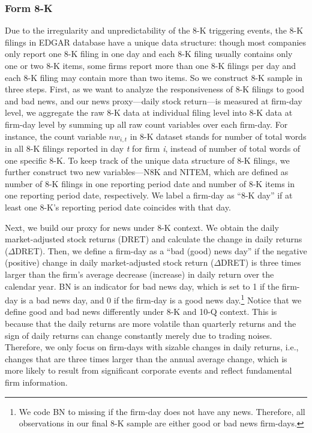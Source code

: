 \documentclass[a4paper]{article}
\begin{document}
\begin{spacing}{2}
\subsubsection{Form 8-K}
Due to the irregularity and unpredictability of the 8-K triggering events, the 8-K filings in EDGAR database have a unique data structure: though most companies only report one 8-K filing in one day and each 8-K filing usually contains only one or two 8-K items, some firms report more than one 8-K filings per day and each 8-K filing may contain more than two items. So we construct 8-K sample in three steps. First, as we want to analyze the responsiveness of 8-K filings to good and bad news, and our news proxy---daily stock return---is measured at firm-day level, we aggregate the raw 8-K data at individual filing level into 8-K data at firm-day level by summing up all raw count variables over each firm-day. For instance, the count variable $nw_{i,t}$ in 8-K dataset stands for number of total words in all 8-K filings reported in day \textit{t} for firm \textit{i}, instead of number of total words of one specific 8-K. To keep track of the unique data structure of 8-K filings, we further construct two new variables---N8K and NITEM, which are defined as number of 8-K filings in one reporting period date and number of 8-K items in one reporting period date, respectively. We label a firm-day as ``8-K day” if at least one 8-K's reporting period date coincides with that day.

Next, we build our proxy for news under 8-K context. We obtain the daily market-adjusted stock returns (DRET) and calculate the change in daily returns ($\Delta$DRET). Then, we define a firm-day as a ``bad (good) news day” if the negative (positive) change in daily market-adjusted stock return ($\Delta$DRET) is three times larger than the firm's average decrease (increase) in daily return over the calendar year. BN is an indicator for bad news day, which is set to 1 if the firm-day is a bad news day, and 0 if the firm-day is a good news day.\footnote{We code BN to missing if the firm-day does not have any news. Therefore, all observations in our final 8-K sample are either good or bad news firm-days.} Notice that we define good and bad news differently under 8-K and 10-Q context. This is because that the daily returns are more volatile than quarterly returns and the sign of daily returns can change constantly merely due to trading noises. Therefore, we only focus on firm-days with sizable changes in daily returns, i.e., changes that are three times larger than the annual average change, which is more likely to result from significant corporate events and reflect fundamental firm information.


\end{spacing}
\end{document}
